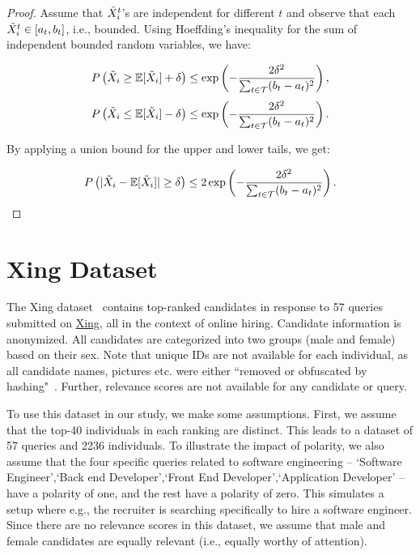 \begin{proof}
Assume that $\Tilde{X}_i^t$'s are independent for different $t$ and observe that each $\Tilde{X}_i^t \in [a_t, b_t]$, i.e., bounded. Using Hoeffding's inequality for the sum of independent bounded random variables, we have:

\[
    P\left( \Tilde{X}_i \geq \mathbb{E}[\Tilde{X}_i] + \delta \right) \leq \exp\left(-\frac{2\delta^2}{\sum_{t \in \mathcal{T}} (b_t - a_t)^2}\right),
\]
\[
    P\left( \Tilde{X}_i \leq \mathbb{E}[\Tilde{X}_i] - \delta \right) \leq \exp\left(-\frac{2\delta^2}{\sum_{t \in \mathcal{T}} (b_t - a_t)^2}\right).
\]

By applying a union bound for the upper and lower tails, we get:

\[
    P\left( |\Tilde{X}_i - \mathbb{E}[\Tilde{X}_i]| \geq \delta \right) \leq 2 \exp\left( -\frac{2\delta^2}{\sum_{t \in \mathcal{T}} (b_t - a_t)^2} \right).
\]
\end{proof}


 

 

























\section{Xing Dataset}
\label{app:xing_dataset}
The Xing dataset~\cite{zehlike2017fa} contains top-ranked candidates in response to 57 queries submitted on \href{http://xing.com}{Xing}, all in the context of online hiring. Candidate information is anonymized. All candidates are categorized into two groups (male and female) based on their sex. Note that unique IDs are not available for each individual, as all candidate names, pictures etc. were either ``removed or obfuscated by hashing"~\cite{zehlike2017fa}. Further, relevance scores are not available for any candidate or query.  

To use this dataset in our study, we make some assumptions. First, we assume that the top-40 individuals in each ranking are distinct. This leads to a dataset of 57 queries and 2236 individuals. To illustrate the impact of polarity, we also assume that the four specific queries related to software engineering -- `Software Engineer',`Back end Developer',`Front End Developer',`Application Developer' -- have a polarity of one, and the rest have a polarity of zero. This simulates a setup where e.g., the recruiter is searching specifically to hire a software engineer. Since there are no relevance scores in this dataset, we assume that male and female candidates are equally relevant (i.e., equally worthy of attention).


